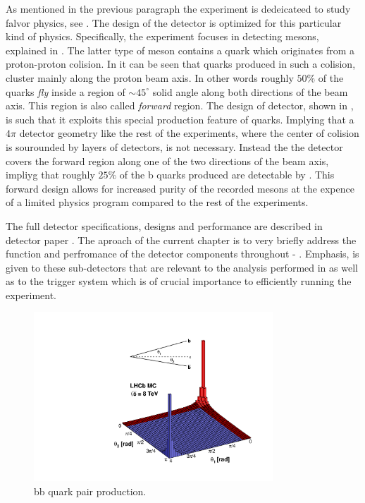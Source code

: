 As mentioned in the previous paragraph the \lhcb experiment is dedeicateed to study falvor physics, see \secref{}.
The design of the \lhcb detector is optimized for this particular kind of physics.
Specifically, the experiment focuses in detecting \B mesons, explained in \secref{}. The latter type of
meson contains a \bquark quark which originates from a proton-proton colision. In \figref{} it can be seen
that \bquark quarks produced in such a colision, cluster mainly along the proton beam axis. In other words
roughly $50\%$ of the \bquark quarks {\it fly} inside a region of $\sim 45^\circ$ solid angle along both
directions of the beam axis. This region is also called {\it forward} region. The design of \lhcb detector,
shown in \figref{}, is such that it exploits this special production feature of \bquark quarks. Implying that
a $4\pi$ detector geometry like the rest of the \lhc experiments, where the center of colision is sourounded
by layers of detectors, is not necessary. Instead the the \lhcb detector covers the forward region along one
of the two directions of the beam axis, impliyg that roughly $25\%$ of the b quarks produced are detectable
by \lhcb. This forward design allows for increased purity of the recorded \B mesons at the expence of a limited
physics program compared to the rest of the \lhcb experiments.

The full \lhcb detector specifications, designs and performance are described in {\color{red} detector paper \cite{jnst}}.
The aproach of the current chapter is to very briefly address the function and perfromance of the detector components
throughout  - . Emphasis, is given to these sub-detectors that are relevant
to the analysis performed in  as well as to the trigger system which is of crucial importance
to efficiently running the \lhcb experiment.

\begin{figure}[t]
  \centering
  \includegraphics[width=0.8\textwidth, trim=0cm 0cm 0cm 2.5cm, clip=true]{Figures/Chapter2/08_rad_acc_scheme_right}
  \caption{bb quark pair production.}
  \label{bb_roduction_angles}
\end{figure}
